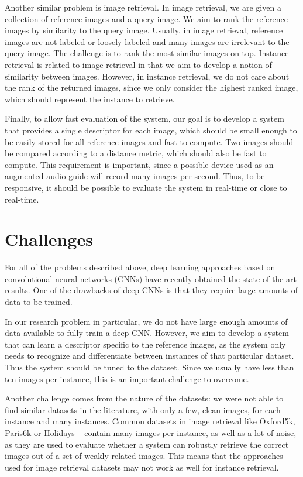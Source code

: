 Another similar problem is image retrieval. In image retrieval,
we are given a collection of reference images and a query image.
We aim to rank the reference images by similarity to the query image.
Usually, in image retrieval, reference images are not labeled or loosely
labeled and many images are irrelevant to the query image. The challenge
is to rank the most similar images on top.
Instance retrieval is related to image retrieval in that we aim to
develop a notion of similarity between images. However, in instance
retrieval, we do not care about the rank of the returned images, since
we only consider the highest ranked image, which should represent the
instance to retrieve.

Finally, to allow fast evaluation of the system, our goal is to develop
a system that provides a single descriptor for each image, which should
be small enough to be easily stored for all reference images and fast
to compute.
Two images should be compared according to a distance metric, which should
also be fast to compute. This requirement is important, since a possible
device used as an augmented audio-guide will record many images per second.
Thus, to be responsive, it should be possible to evaluate the system in
real-time or close to real-time.


\section{Challenges}
For all of the problems described above, deep learning approaches
based on convolutional neural networks (CNNs) have recently obtained
the state-of-the-art results. One of the drawbacks of deep CNNs is that
they require large amounts of data to be trained.

In our research problem in particular, we do not
have large enough amounts of data available to fully train a deep CNN.
However, we aim to develop a system that can learn a descriptor
specific to the reference images,
as the system only needs to recognize and differentiate between
instances of that particular dataset. Thus the system should be tuned to
the dataset. Since we usually have less than ten images per instance,
this is an important challenge to overcome.

Another challenge comes from the nature of the datasets: we were not
able to find similar datasets in the literature, with only a few,
clean images, for each instance and many instances.
Common datasets in image retrieval like Oxford5k, Paris6k or Holidays
~\cite{philbin_object_2007,philbin_lost_2008,jegou_hamming_2008}
contain many images per instance, as well as a lot of noise,
as they are used to evaluate whether a system can robustly retrieve the
correct images out of a set of weakly related images.
This means that the approaches used for image retrieval datasets may
not work as well for instance retrieval.


